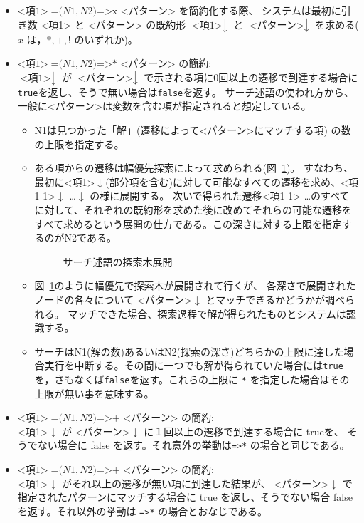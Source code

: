 \documentclass{article}
\begin{document}
\begin{itemize}
\item $\mbox{<項1>}\; \mbox{=(}N1, N2\mbox{)=>x <パターン>}$ を簡約化する際、
      システムは最初に引き数 <項1> と <パターン> の既約形 $\mbox{<項1>}\downarrow$ と
      $\mbox{<パターン>}\downarrow$ を求める($x$ は，$*, +, !$  のいずれか)。

\item $\mbox{<項1>}\; \mbox{=(}N1, N2\mbox{)=>* <パターン>}$ の簡約:\\
      $\mbox{<項1>}\downarrow$ が $\mbox{<パターン>}\downarrow$ で示される項に0回以上の遷移で到達する場合に\texttt{true}を返し、そうで無い場合は\texttt{false}を返す。
サーチ述語の使われ方から、一般に<パターン>は変数を含む項が指定されると想定している。
\begin{itemize}
\item N1は見つかった「解」(遷移によって<パターン>にマッチする項) の数の上限を指定する。

\item ある項からの遷移は幅優先探索によって求められる(図~\ref{fig:dfs})。
すなわち、最初に<項1>$\downarrow$(部分項を含む)に対して可能なすべての遷移を求め、<項1-1>$\downarrow$ \ldots <項1-k>$\downarrow$ の様に展開する。
次いで得られた遷移<項1-1> \ldots <項1-n>のすべてに対して、それぞれの既約形を求めた後に改めてそれらの可能な遷移をすべて求めるという展開の仕方である。この深さに対する上限を指定するのがN2である。
\begin{figure}[htbp]
  \begin{center}
    
    \caption{{サーチ述語の探索木展開}}
    \label{fig:dfs}
  \end{center}
\end{figure}

\item 図~{\ref{fig:dfs}}のように幅優先で探索木が展開されて行くが、
  各深さで展開されたノードの各々について <パターン>$\downarrow$ とマッチできるかどうかが調べられる。
  マッチできた場合、探索過程で解が得られたものとシステムは認識する。

\item サーチはN1(解の数)あるいはN2(探索の深さ)どちらかの上限に達した場合実行を中断する。その間に一つでも解が得られていた場合には\texttt{true}を，さもなくば\texttt{false}を返す。これらの上限に \texttt{*} を指定した場合はその上限が無い事を意味する。
\end{itemize}

\item $\mbox{<項1>}\; \mbox{=(}N1, N2\mbox{)=>+ <パターン>}$ の簡約:\\
      <項1>$\downarrow$ が <パターン>$\downarrow$ に１回以上の遷移で到達する場合に trueを、
	そうでない場合に false を返す。それ意外の挙動は\verb|=>*| の場合と同じである。

\item $\mbox{<項1>}\; \mbox{=(}N1, N2\mbox{)=>+ <パターン>}$ の簡約:\\
      <項1>$\downarrow$ がそれ以上の遷移が無い項に到達した結果が、
      <パターン>$\downarrow$ で指定されたパターンにマッチする場合に true を返し、そうでない場合
      false を返す。それ以外の挙動は \verb|=>*| の場合とおなじである。
\end{itemize}
\end{document}

